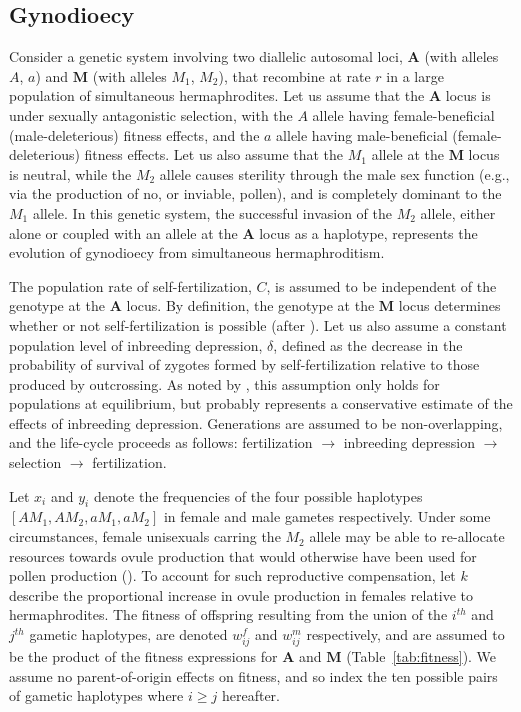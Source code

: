 \documentclass[9pt,twocolumn,twoside,lineno]{gsajnl}
\begin{document}
\subsection{Gynodioecy}
Consider a genetic system involving two diallelic autosomal loci, $\mathbf{A}$ (with alleles $A$, $a$) and $\mathbf{M}$ (with alleles $M_1$, $M_2$), that recombine at rate $r$ in a large population of simultaneous hermaphrodites. Let us assume that the $\mathbf{A}$ locus is under sexually antagonistic selection, with the $A$ allele having female-beneficial (male-deleterious) fitness effects, and the $a$ allele having male-beneficial (female-deleterious) fitness effects. Let us also assume that the $M_1$ allele at the $\mathbf{M}$ locus is neutral, while the $M_2$ allele causes sterility through the male sex function (e.g., via the production of no, or inviable, pollen), and is completely dominant to the $M_1$ allele. In this genetic system, the successful invasion of the $M_2$ allele, either alone or coupled with an allele at the $\mathbf{A}$ locus as a haplotype, represents the evolution of gynodioecy from simultaneous hermaphroditism. 

The population rate of self-fertilization, $C$, is assumed to be independent of the genotype at the $\mathbf{A}$ locus. By definition, the genotype at the $\mathbf{M}$ locus determines whether or not self-fertilization is possible (after \citealt{Charlesworth1978a}). Let us also assume a constant population level of inbreeding depression, $\delta$, defined as the decrease in the probability of survival of zygotes formed by self-fertilization relative to those produced by outcrossing. As noted by \citet{Charlesworth1978a}, this assumption only holds for populations at equilibrium, but probably represents a conservative estimate of the effects of inbreeding depression. Generations are assumed to be non-overlapping, and the life-cycle proceeds as follows: fertilization $\rightarrow$ inbreeding depression $\rightarrow$ selection $\rightarrow$ fertilization.

Let $x_i$ and $y_i$ denote the frequencies of the four possible haplotypes $[AM_1,AM_2,aM_1,aM_2]$ in female and male gametes respectively. Under some circumstances, female unisexuals carring the $M_2$ allele may be able to re-allocate resources towards ovule production that would otherwise have been used for pollen production (\citealt{Lloyd1975,Lloyd1976,Charlesworth1978a}). To account for such reproductive compensation, let $k$ describe the proportional increase in ovule production in females relative to hermaphrodites. The fitness of offspring resulting from the union of the $i^{th}$ and $j^{th}$ gametic haplotypes, are denoted $w^f_{ij}$ and $w^m_{ij}$ respectively, and are assumed to be the product of the fitness expressions for $\mathbf{A}$ and $\mathbf{M}$ (Table~\ref{tab:fitness}). We assume no parent-of-origin effects on fitness, and so index the ten possible pairs of gametic haplotypes where $i \geq j$ hereafter.
\end{document}
